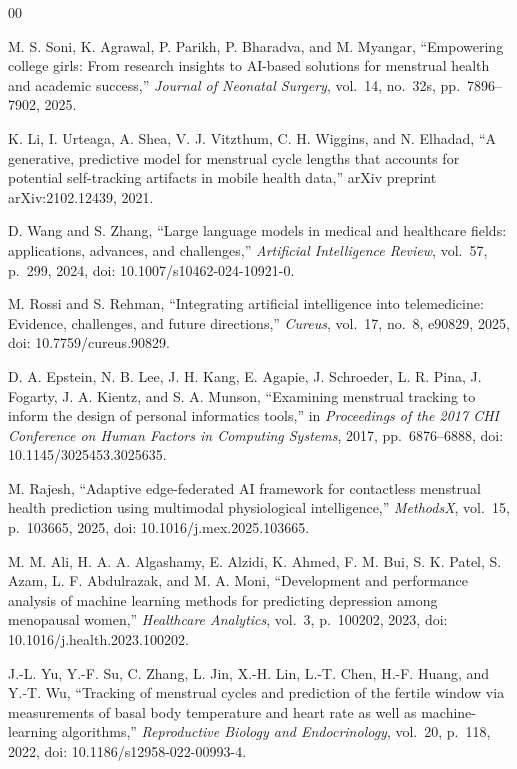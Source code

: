 \begin{thebibliography}{00}

M. S. Soni, K. Agrawal, P. Parikh, P. Bharadva, and M. Myangar,
``Empowering college girls: From research insights to AI-based solutions
for menstrual health and academic success,''
\textit{Journal of Neonatal Surgery}, vol.~14, no.~32s,
pp.~7896--7902, 2025.

K. Li, I. Urteaga, A. Shea, V. J. Vitzthum, C. H. Wiggins, and N. Elhadad,
``A generative, predictive model for menstrual cycle lengths that accounts
for potential self-tracking artifacts in mobile health data,''
arXiv preprint arXiv:2102.12439, 2021.

D. Wang and S. Zhang,
``Large language models in medical and healthcare fields: applications,
advances, and challenges,''
\textit{Artificial Intelligence Review}, vol.~57, p.~299, 2024,
doi: 10.1007/s10462-024-10921-0.

M. Rossi and S. Rehman,
``Integrating artificial intelligence into telemedicine: Evidence, challenges,
and future directions,''
\textit{Cureus}, vol.~17, no.~8, e90829, 2025,
doi: 10.7759/cureus.90829.

D. A. Epstein, N. B. Lee, J. H. Kang, E. Agapie, J. Schroeder,
L. R. Pina, J. Fogarty, J. A. Kientz, and S. A. Munson,
``Examining menstrual tracking to inform the design of personal informatics
tools,''
in \textit{Proceedings of the 2017 CHI Conference on Human Factors in
Computing Systems}, 2017, pp.~6876--6888,
doi: 10.1145/3025453.3025635.

M. Rajesh,
``Adaptive edge-federated AI framework for contactless menstrual health
prediction using multimodal physiological intelligence,''
\textit{MethodsX}, vol.~15, p.~103665, 2025,
doi: 10.1016/j.mex.2025.103665.

M. M. Ali, H. A. A. Algashamy, E. Alzidi, K. Ahmed,
F. M. Bui, S. K. Patel, S. Azam, L. F. Abdulrazak, and M. A. Moni,
``Development and performance analysis of machine learning methods for
predicting depression among menopausal women,''
\textit{Healthcare Analytics}, vol.~3, p.~100202, 2023,
doi: 10.1016/j.health.2023.100202.

J.-L. Yu, Y.-F. Su, C. Zhang, L. Jin, X.-H. Lin, L.-T. Chen,
H.-F. Huang, and Y.-T. Wu,
``Tracking of menstrual cycles and prediction of the fertile window via
measurements of basal body temperature and heart rate as well as
machine-learning algorithms,''
\textit{Reproductive Biology and Endocrinology}, vol.~20, p.~118, 2022,
doi: 10.1186/s12958-022-00993-4.


\end{thebibliography}
